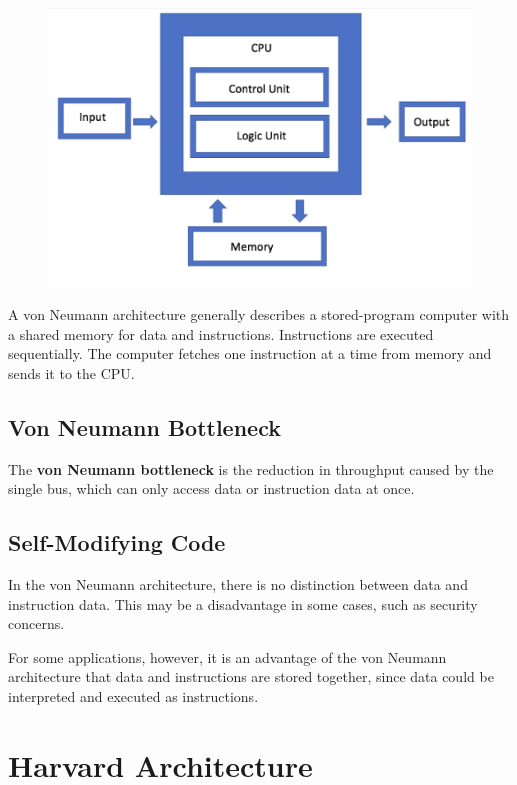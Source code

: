 \begin{figure}[h!]
	\includegraphics[scale=0.5]{./img/von-Neumann.png}
\end{figure}

A von Neumann architecture generally describes a stored-program computer with a shared memory for data and instructions. Instructions are executed sequentially. The computer fetches one instruction at a time from memory and sends it to the CPU.

\subsection{Von Neumann Bottleneck}

The \textbf{von Neumann bottleneck} is the reduction in throughput caused by the single bus, which can only access data or instruction data at once.

\subsection{Self-Modifying Code}

In the von Neumann architecture, there is no distinction between data and instruction data. This may be a disadvantage in some cases, such as security concerns.

For some applications, however, it is an advantage of the von Neumann architecture that data and instructions are stored together, since data could be interpreted and executed as instructions.

\section{Harvard Architecture}

